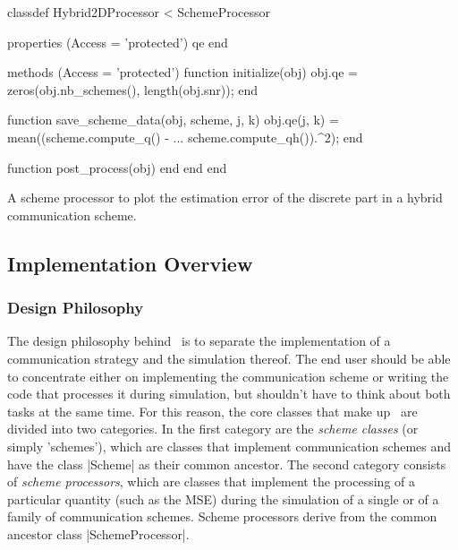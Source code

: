 \begin{listing}
\begin{Code}
  classdef Hybrid2DProcessor < SchemeProcessor
      
      properties (Access = 'protected')
          qe
      end
      
      methods (Access = 'protected')
          function initialize(obj)
              obj.qe = zeros(obj.nb_schemes(), length(obj.snr));
          end
          
          function save_scheme_data(obj, scheme, j, k)
              obj.qe(j, k) = mean((scheme.compute_q() - ...
                scheme.compute_qh()).^2);
          end
          
          function post_process(obj)
          end
      end
  end
\end{Code}
\caption{A scheme processor to plot the estimation error of the discrete part in
a hybrid communication scheme.}
\label{lst:hybridprocessor}
\end{listing}


\subsection{Implementation Overview}\label{sec:impoverview}

\subsubsection{Design Philosophy}

The design philosophy behind \jscsim\ is to separate the implementation of a
communication strategy and the simulation thereof. The end user should be able
to concentrate either on implementing the communication scheme or writing the
code that processes it during simulation, but shouldn't have to think about both
tasks at the same time.  For this reason, the core classes that make up \jscsim\
are divided into two categories. In the first category are the \emph{scheme
classes} (or simply 'schemes'), which are classes that implement communication
schemes and have the class |Scheme| as their common ancestor. The second
category consists of  \emph{scheme processors}, which are classes that implement
the processing of a particular quantity (such as the MSE) during the simulation
of a single or of a family of communication schemes. Scheme processors derive
from the common ancestor class |SchemeProcessor|. 

